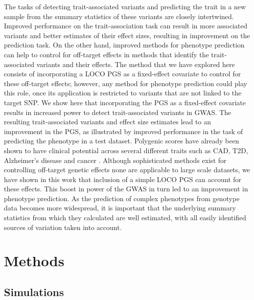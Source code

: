 \documentclass[doublespacing]{bmcart}
\begin{document}
The tasks of detecting trait-associated variants and predicting the trait in a new sample from the summary statistics of these variants are closely intertwined. Improved performance on the trait-association task can result in more associated variants and better estimates of their effect sizes, resulting in improvement on the prediction task. On the other hand, improved methods for phenotype prediction can help to control for off-target effects in methods that identify the trait-associated variants and their effects. The method that we have explored here consists of incorporating a LOCO PGS as a fixed-effect covariate to control for these off-target effects; however, any method for phenotype prediction could play this role, once its application is restricted to variants that are not linked to the target SNP. We show here that incorporating the PGS as a fixed-effect covariate results in increased power to detect trait-associated variants in GWAS. The resulting trait-associated variants and effect size estimates lead to an improvement in the PGS, as illustrated by improved performance in the task of predicting the phenotype in a test dataset. Polygenic scores have already been shown to have clinical potential across several different traits such as CAD, T2D, Alzheimer's disease and cancer \cite{lambert2019towards}. Although sophisticated methods exist for controlling off-target genetic effects none are applicable to large scale datasets, we have shown in this work that inclusion of a simple LOCO PGS can account for these effects. This boost in power of the GWAS in turn led to an improvement in phenotype prediction. As the prediction of complex phenotypes from genotype data becomes more widespread, it is important that the underlying summary statistics from which they calculated are well estimated, with all easily identified sources of variation taken into account.
 
\section*{Methods}
\subsection*{Simulations} 
\end{document}
